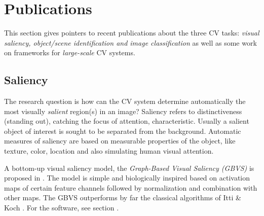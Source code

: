 \section{Publications}
\label{sec:pubs}

This section gives pointers to recent publications about the three CV tasks:  {\em visual saliency, object/scene identification and image classification} as well as some work on frameworks for {\em large-scale} CV systems.

\subsection{Saliency}

The research question is how can the CV system determine automatically the most visually {\em salient} region(s) in an image? Saliency refers to distinctiveness (standing out), catching the focus of attention, characteristic. Usually a salient object of interest is sought to be separated from the background. Automatic measures of saliency are based on measurable properties of the object,
like texture, color, location and also simulating human visual attention.

A bottom-up visual saliency model, the {\em Graph-Based Visual Saliency (GBVS)} is proposed in \cite{Harel07graph-basedvisual}. The model is simple and biologically inspired based on activation maps of certain feature channels followed by normalization and combination with other maps. The GBVS outperforms by far the classical algorithms of Itti \& Koch \cite{Itti_Koch01nrn}. For the software, see  section .

